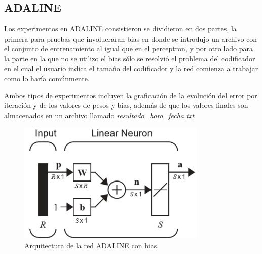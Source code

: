 \subsection{ADALINE}
        Los experimentos en ADALINE consistieron se dividieron en dos partes, la primera para pruebas que involucraran bias en donde se introdujo un archivo con el conjunto de entrenamiento al igual que en el perceptron, y por otro lado para la parte en la que no se utilizo el bias sólo se resolvió el problema del codificador en el cual el usuario indica el tamaño del codificador y la red comienza a trabajar como lo haría comúnmente.
        
        Ambos tipos de experimentos incluyen la graficación de la evolución del error por iteración y de los valores de pesos y bias, además de que los valores finales son almacenados en un archivo llamado \emph{resultado\_hora\_fecha.txt}
        \begin{figure}[H]
            \begin{center}
                \includegraphics[width=9cm]{img/adaline/arquitectura.png}
                \caption{Arquitectura de la red ADALINE con bias. \cite{libro1}}
                \label{fig:adaline-diagrama2}
            \end{center}
        \end{figure}
